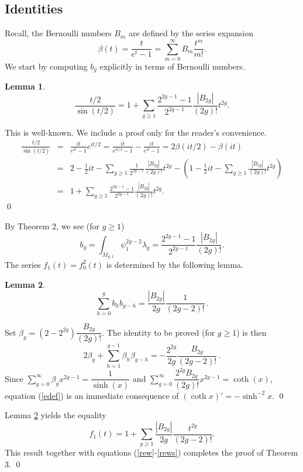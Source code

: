 \documentclass[11 pt]{amsart}
\newtheorem{lm}{Lemma}
\newcommand{\bpf}{\noindent {\em Proof.} }
\newcommand{\epf}{\qed \vspace{+10pt}}
\begin{document}
\subsection{Identities} Recall,
the Bernoulli numbers $B_m$ are defined by the
series expansion
\begin{equation}
\label{defff}
\beta(t)=\dfrac{t}{e^t-1} = \sum\limits_{m=0}^{\infty}B_m\dfrac{t^m}{m!}.
\end{equation}
We start by computing $b_g$ explicitly in terms of Bernoulli
numbers.
 


\begin{lm}
\label{bex}
$$
\frac{t/2}{\sin(t/2)}=1+\sum_{g\ge1}\frac{2^{2g-1}-1}{2^{2g-1}}
\frac{|B_{2g}|}{(2g)!}t^{2g}.
$$
\end{lm}

\bpf
This is well-known. We include a proof only for the reader's convenience.
\begin{eqnarray*}
\frac{t/2}{\sin(t/2)}&=&
\frac{it}{e^{it}-1}e^{it/2}=
\frac{it}{e^{it/2}-1}-\frac{it}{e^{it}-1}
=2\beta(it/2)-\beta(it)   \\
&=&2-\frac12it-\sum_{g\ge1}\frac1{2^{2g-1}}\frac{|B_{2g}|}{(2g)!}t^{2g}
-\left(1-\frac12it-\sum_{g\ge1}\frac{|B_{2g}|}{(2g)!}t^{2g}\right)  \\
&=&1+\sum_{g\ge1}\frac{2^{2g-1}-1}{2^{2g-1}}\frac{|B_{2g}|}{(2g)!}t^{2g}.
\end{eqnarray*}
\epf

By Theorem 2, we see (for $g\geq 1$)
$$b_g = \int_{\overline{M}_{g,1}} \psi_1^{2g-2}\lambda_g =
\frac{2^{2g-1}-1}{2^{2g-1}}
\frac{|B_{2g}|}{(2g)!}.$$
The series $f_1(t)= f_0^2(t)$ is determined by the
following lemma.

\begin{lm} \label{bbbq}
$$
\sum_{h=0}^{g}b_hb_{g-h}=\frac{|B_{2g}|}{2g}
\frac1{(2g-2)!}\,.
$$
\end{lm}

\bpf
Set $\beta_g=(2-2^{2g})\dfrac{B_{2g}}{(2g)!}$.
The identity to be proved (for $g\ge1$) is then
\begin{equation}
\label{edef}
2\beta_g+\sum_{h=1}^{g-1}\beta_h\beta_{g-h}=
-\frac{2^{2g}}{2g}\frac{B_{2g}}{(2g-2)!}\,.
\end{equation}
Since $\sum\limits_{g=0}^{\infty}\beta_gx^{2g-1}=\dfrac1{\sinh(x)}$
and $\sum\limits_{g=0}^{\infty}\dfrac{2^{2g}B_{2g}}{(2g)!}x^{2g-1}=\coth(x)$,
equation (\ref{edef}) is an immediate consequence of
$(\coth x)'= -\sinh^{-2}x. 
$
\epf

Lemma \ref{bbbq} yields the equality
$$f_1(t)= 1 + \sum_{g\geq 1} \frac{|B_{2g}|}{2g} \frac{t^{2g}}{(2g-2)!}.$$
This result together with  equations (\ref{rew}-\ref{rews}) completes
the proof of Theorem 3. \qed
\end{document}
